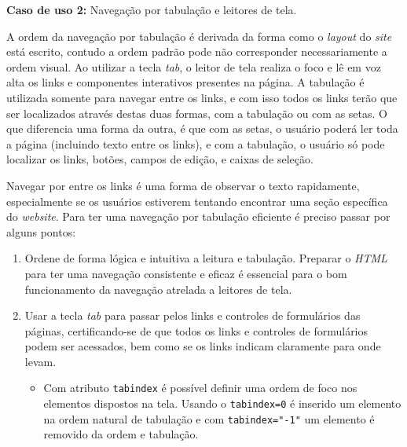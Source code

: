 {{{\textbf{Caso de uso 2:} Navegação por tabulação e leitores de tela.

A ordem da navegação por tabulação é derivada da forma como o \textit{layout} do \textit{site} está escrito, contudo a ordem padrão pode não corresponder necessariamente a ordem visual. Ao utilizar a tecla \textit{tab}, o leitor de tela realiza o foco e lê em voz alta os links e componentes interativos presentes na página.  A tabulação é utilizada somente para navegar entre os links, e com isso todos os links terão que ser localizados através destas duas formas, com a tabulação ou com as setas. O que diferencia uma forma da outra, é que com as setas, o usuário poderá ler toda a página (incluindo texto entre os links), e com a tabulação, o usuário só pode localizar os links, botões, campos de edição, e caixas de seleção.


Navegar por entre os links é uma forma de observar o texto rapidamente, especialmente se os usuários estiverem tentando encontrar uma seção específica do \textit{website}. Para ter uma navegação por tabulação eficiente é preciso passar por alguns pontos: 
\begin{enumerate}
    \item Ordene de forma lógica e intuitiva a leitura e tabulação. Preparar o \textit{HTML}\cite{HTML} para ter uma navegação consistente e eficaz é essencial para o bom funcionamento da navegação atrelada a leitores de tela. 
    \item Usar a tecla \textit{tab} para passar pelos links e controles de formulários
    das páginas, certificando-se de que todos os links e controles de
    formulários podem ser acessados, bem como se os links indicam
    claramente para onde levam. 
    \begin{itemize}
        \item Com atributo \lstinline{tabindex} é possível definir uma ordem de foco nos elementos dispostos na tela. Usando o \lstinline{tabindex=0} é inserido um elemento na ordem natural de tabulação e com \lstinline{tabindex="-1"} um elemento é removido da ordem e tabulação.


\end{itemize}
\end{enumerate}}}}
